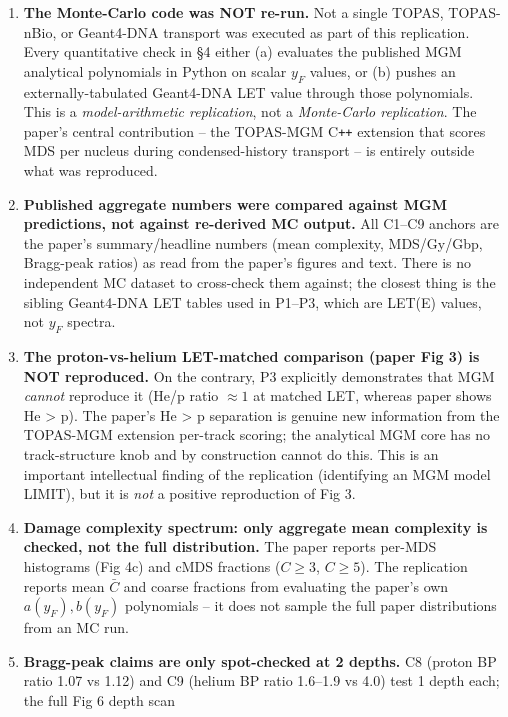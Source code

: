\documentclass[11pt]{article}
\begin{document}
\begin{enumerate}
  \item \textbf{The Monte-Carlo code was NOT re-run.} Not a single TOPAS,
    TOPAS-nBio, or Geant4-DNA transport was executed as part of this
    replication. Every quantitative check in \S 4 either
    (a) evaluates the published MGM analytical polynomials in Python
    on scalar $y_F$ values, or (b) pushes an externally-tabulated
    Geant4-DNA LET value through those polynomials. This is a
    \emph{model-arithmetic replication}, not a \emph{Monte-Carlo
    replication}. The paper's central contribution -- the TOPAS-MGM
    C\texttt{++} extension that scores MDS per nucleus during
    condensed-history transport -- is entirely outside what was
    reproduced.
  \item \textbf{Published aggregate numbers were compared against
    MGM predictions, not against re-derived MC output.} All C1--C9
    anchors are the paper's summary/headline numbers (mean complexity,
    MDS/Gy/Gbp, Bragg-peak ratios) as read from the paper's figures and
    text. There is no independent MC dataset to cross-check them
    against; the closest thing is the sibling Geant4-DNA LET tables
    used in P1--P3, which are LET(E) values, not $y_F$ spectra.
  \item \textbf{The proton-vs-helium LET-matched comparison
    (paper Fig 3) is NOT reproduced.} On the contrary,
    P3 explicitly demonstrates that MGM \emph{cannot} reproduce it
    (He/p ratio $\approx 1$ at matched LET, whereas paper shows
    He > p). The paper's He > p separation is genuine new information
    from the TOPAS-MGM extension per-track scoring; the analytical
    MGM core has no track-structure knob and by construction cannot
    do this. This is an important intellectual finding of the
    replication (identifying an MGM model LIMIT), but it is
    \emph{not} a positive reproduction of Fig 3.
  \item \textbf{Damage complexity spectrum: only aggregate mean
    complexity is checked, not the full distribution.} The paper
    reports per-MDS histograms (Fig 4c) and cMDS fractions ($C \ge 3$,
    $C \ge 5$). The replication reports mean $\bar C$ and coarse
    fractions from evaluating the paper's own $a(y_F), b(y_F)$
    polynomials -- it does not sample the full paper distributions
    from an MC run.
  \item \textbf{Bragg-peak claims are only spot-checked at 2 depths.}
    C8 (proton BP ratio 1.07 vs 1.12) and C9 (helium BP ratio
    1.6--1.9 vs 4.0) test 1 depth each; the full Fig 6 depth scan

\end{enumerate}
\end{document}
